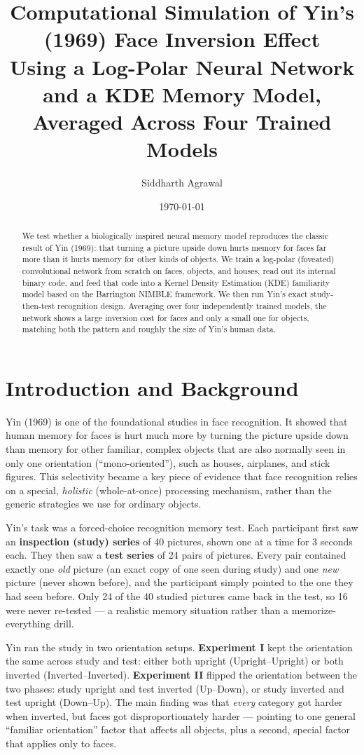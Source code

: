 \documentclass[11pt]{article}
\title{\vspace{-1.5em}Computational Simulation of Yin's (1969) Face Inversion Effect\\[0.3em]
\large Using a Log-Polar Neural Network and a KDE Memory Model,\\ Averaged Across Four Trained Models}
\author{Siddharth Agrawal}
\date{\today}
\begin{document}
\maketitle

\begin{abstract}
\noindent
We test whether a biologically inspired neural memory model reproduces the classic
result of Yin (1969): that turning a picture upside down hurts memory for faces far more
than it hurts memory for other kinds of objects. We train a log-polar (foveated)
convolutional network from scratch on faces, objects, and houses, read out its internal
binary code, and feed that code into a Kernel Density Estimation (KDE) familiarity model
based on the Barrington NIMBLE framework. We then run Yin's exact study-then-test
recognition design. Averaging over four independently trained models, the network shows a
large inversion cost for faces and only a small one for objects, matching both the pattern
and roughly the size of Yin's human data.
\end{abstract}

\section{Introduction and Background}

Yin (1969) is one of the foundational studies in face recognition. It showed that human
memory for faces is hurt much more by turning the picture upside down than memory for other
familiar, complex objects that are also normally seen in only one orientation
(``mono-oriented''), such as houses, airplanes, and stick figures. This selectivity became
a key piece of evidence that face recognition relies on a special, \emph{holistic}
(whole-at-once) processing mechanism, rather than the generic strategies we use for ordinary
objects.

Yin's task was a forced-choice recognition memory test. Each participant first saw an
\textbf{inspection (study) series} of 40 pictures, shown one at a time for 3 seconds each.
They then saw a \textbf{test series} of 24 pairs of pictures. Every pair contained exactly
one \emph{old} picture (an exact copy of one seen during study) and one \emph{new} picture
(never shown before), and the participant simply pointed to the one they had seen before.
Only 24 of the 40 studied pictures came back in the test, so 16 were never re-tested --- a
realistic memory situation rather than a memorize-everything drill.

Yin ran the study in two orientation setups. \textbf{Experiment I} kept the orientation the
same across study and test: either both upright (Upright--Upright) or both inverted
(Inverted--Inverted). \textbf{Experiment II} flipped the orientation between the two phases:
study upright and test inverted (Up--Down), or study inverted and test upright (Down--Up).
The main finding was that \emph{every} category got harder when inverted, but faces got
disproportionately harder --- pointing to one general ``familiar orientation'' factor that
affects all objects, plus a second, special factor that applies only to faces.
\end{document}
